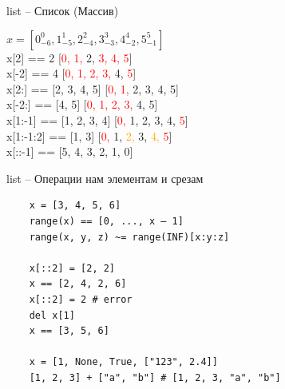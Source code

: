 \documentclass{article}
\begin{document}
\begin{center} list – Список (Массив) \end{center}
{
\Huge
\begin{flushleft}
$x = [0_{-6}^{0}, 1_{-5}^{1}, 2_{-4}^{2}, 3_{-3}^{3}, 4_{-2}^{4}, 5_{-1}^{5}]$ \\
\vspace{0.5cm}
x[2] == 2 \hspace{2cm}[\textcolor{red}{0, 1,} 2, \textcolor{red}{3, 4, 5}] \\
\vspace{0.5cm}
x[-2] == 4 \hspace{2cm}[\textcolor{red}{0, 1, 2, 3,} 4, \textcolor{red}{5}] \\
\vspace{0.5cm}
x[2:] == [2, 3, 4, 5] \hspace{2cm}[\textcolor{red}{0, 1, }2, 3, 4, 5] \\
\vspace{0.5cm}
x[-2:] == [4, 5] \hspace{2cm}[\textcolor{red}{0, 1, 2, 3,} 4, 5] \\
\vspace{0.5cm}
x[1:-1] == [1, 2, 3, 4] \hspace{2cm}[\textcolor{red}{0,} 1, 2, 3, 4, \textcolor{red}{5}] \\
\vspace{0.5cm}
x[1:-1:2] == [1, 3] \hspace{2cm}[\textcolor{red}{0,} 1, \textcolor{orange}{2,} 3, \textcolor{orange}{4,} \textcolor{red}{5}] \\
\vspace{0.5cm}
x[::-1] == [5, 4, 3, 2, 1, 0] \\
\end{flushleft}
}
\newpage

\begin{center} list – Операции нам элементам и срезам \end{center}
\vspace{15pt}
\begin{lstlisting}
	x = [3, 4, 5, 6]
	range(x) == [0, ..., x – 1]
	range(x, y, z) ~= range(INF)[x:y:z]

	x[::2] = [2, 2]  
	x == [2, 4, 2, 6]
	x[::2] = 2 # error
	del x[1] 
	x == [3, 5, 6]
	
	x = [1, None, True, ["123", 2.4]]
	[1, 2, 3] + ["a", "b"] # [1, 2, 3, "a", "b"]
\end{lstlisting}
\newpage
\end{document}

